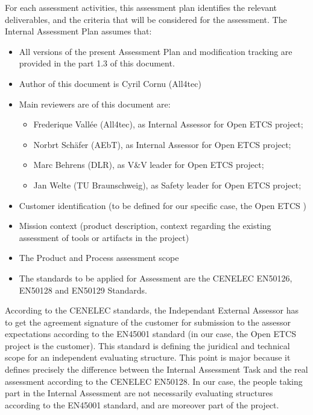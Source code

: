 \documentclass{template/openetcs_article}
\begin{document}
For each assessment activities, this assessment plan identifies the relevant deliverables, and the criteria that will be considered for the assessment.
The Internal Assessment Plan assumes that: 
\begin{itemize}
\item All versions of the present Assessment Plan and modification tracking are provided in the part 1.3 of this document.
\item Author of this document is Cyril Cornu (All4tec)
\item Main reviewers are of this document are:
	\begin{itemize}
	\item Frederique Vall\'ee (All4tec), as Internal Assessor for Open ETCS project;
	\item Norbrt Sch\"afer  (AEbT),  as Internal Assessor for Open ETCS project;
	\item Marc Behrens (DLR), as V\&V leader for Open ETCS project;
	\item Jan Welte (TU Braunschweig), as Safety leader for Open ETCS project;
	\end{itemize}
\item Customer identification (to be defined for our specific case, the Open ETCS )
\item Mission context (product description, context regarding the existing assessment of tools or artifacts in the project)
\item The Product and Process assessment scope
\item The standards to be applied for Assessment are the CENELEC EN50126, EN50128 and EN50129 Standards.
\end{itemize}

According to the CENELEC standards, the Independant External Assessor has to get the agreement signature of the customer for submission to the assessor expectations according to the EN45001 standard  (in our case, the Open ETCS project is the customer). This standard is defining the juridical and technical scope for an independent evaluating structure.
This point is major because it defines precisely the difference between the Internal Assessment Task and the real assessment according to the CENELEC EN50128. In our case, the people taking part in the Internal Assessment are not necessarily evaluating structures according to the EN45001 standard, and are moreover part of the project.


\newpage
\end{document}

